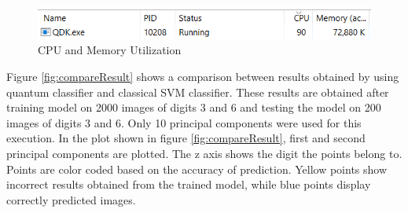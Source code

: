 \documentclass[english,a4paper,11pt,oneside,onecolumn]{book}
\begin{document}
\begin{figure}[H]
    \centering
    \includegraphics{Images/CPUandMemoryUtilization.PNG}
    \caption{CPU and Memory Utilization}
    \label{fig:cpu}
\end{figure}

Figure \ref{fig:compareResult} shows a comparison between results obtained by using quantum classifier and classical SVM classifier. These results are obtained after training model on 2000 images of digits 3 and 6 and testing the model on 200 images of digits 3 and 6. Only 10 principal components were used for this execution. In the plot shown in figure \ref{fig:compareResult}, first and second principal components are plotted. The z axis shows the digit the points belong to. Points are color coded based on the accuracy of prediction. Yellow points show incorrect results obtained from the trained model, while blue points display correctly predicted images.
\end{document}
